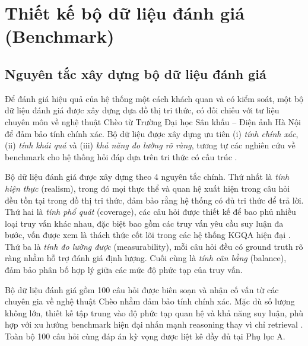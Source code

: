 %

\section{Thiết kế bộ dữ liệu đánh giá (Benchmark)}

\subsection{Nguyên tắc xây dựng bộ dữ liệu đánh giá}

Để đánh giá hiệu quả của hệ thống một cách khách quan và có kiểm soát, một bộ dữ liệu đánh giá được xây dựng dựa đồ thị tri thức, có đối chiếu với tư liệu chuyên môn về nghệ thuật Chèo từ Trường Đại học Sân khấu – Điện ảnh Hà Nội để đảm bảo tính chính xác. Bộ dữ liệu được xây dựng ưu tiên (i) \textit{tính chính xác}, (ii) \textit{tính khái quá} và (iii) \textit{khả năng đo lường rõ ràng}, tương tự các nghiên cứu về benchmark cho hệ thống hỏi đáp dựa trên tri thức có cấu trúc \cite{peng2025m3gqa}.

Bộ dữ liệu đánh giá được xây dựng theo 4 nguyên tắc chính. Thứ nhất là \textit{tính hiện thực} (realism), trong đó mọi thực thể và quan hệ xuất hiện trong câu hỏi đều tồn tại trong đồ thị tri thức, đảm bảo rằng hệ thống có đủ tri thức để trả lời. Thứ hai là \textit{tính phổ quát} (coverage), các câu hỏi được thiết kế để bao phủ nhiều loại truy vấn khác nhau, đặc biệt bao gồm các truy vấn yêu cầu suy luận đa bước, vốn được xem là thách thức cốt lõi trong các hệ thống KGQA hiện đại \cite{wang2023multihop}. Thứ ba là \textit{tính đo lường được} (measurability), mỗi câu hỏi đều có ground truth rõ ràng nhằm hỗ trợ đánh giá định lượng. Cuối cùng là \textit{tính cân bằng} (balance), đảm bảo phân bố hợp lý giữa các mức độ phức tạp của truy vấn.

Bộ dữ liệu đánh giá gồm 100 câu hỏi được biên soạn và nhận cố vấn từ các chuyên gia về nghệ thuật Chèo nhằm đảm bảo tính chính xác. Mặc dù số lượng không lớn, thiết kế tập trung vào độ phức tạp quan hệ và khả năng suy luận, phù hợp với xu hướng benchmark hiện đại nhấn mạnh reasoning thay vì chỉ retrieval \cite{peng2025m3gqa}. Toàn bộ 100 câu hỏi cùng đáp án kỳ vọng được liệt kê đầy đủ tại Phụ lục A.

